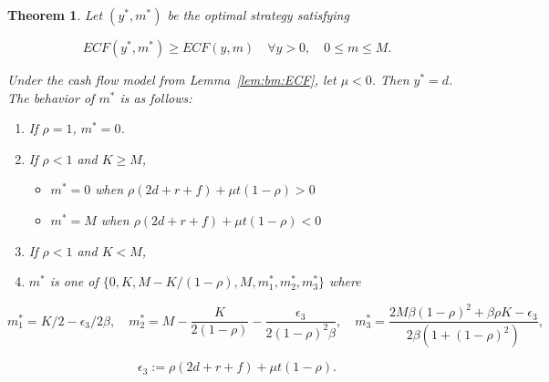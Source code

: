 \documentclass[11pt]{article}
\theoremstyle{plain}
\numberwithin{equation}{section}
\newtheorem{thm}{Theorem}[section]
\newcommand{\Red}{\color{Red}}
\begin{document}
{{\begin{thm}\label{thm:single:muNeg}
	Let $(y^*, m^*)$ be the optimal strategy satisfying

$$ECF(y^*,m^*)\geq ECF(y,m) \quad \forall y>0,\quad  0\leq m\leq M. $$

{\Red Under the cash flow model from  Lemma~\ref{lem:bm:ECF}, let $\mu<0$. Then $y^*=d$. The behavior of $m^*$ is as follows:}
\begin{enumerate}
	\item If $\rho=1$, $m^*=0$.
	\item If $\rho<1$ and $K\geq M$,
		\begin{itemize}
			\item $m^*=0$ when $\rho(2d+r+f)+\mu t(1-\rho)>0$
			\item $m^*=M$ when $\rho(2d+r+f)+\mu t(1-\rho)<0$
		\end{itemize}
	\item If $\rho<1$ and $K< M$,	
	\item[] $m^*$ is one of $\{0,K, M-K/(1-\rho), M, m^*_1, m^*_2, m^*_3\}$ where  
\end{enumerate}
%
$$ 
m^*_1=K/2-\epsilon_3/2\beta, \quad
m^*_2=M-\frac{K}{2(1-\rho)}-\frac{\epsilon_3}{2(1-\rho)^2\beta},
\quad 
m^*_3=\frac{2M\beta (1-\rho)^2 +\beta\rho K-\epsilon_3}{2\beta(1+(1-\rho)^2)},
$$ 

$$\epsilon_3:=\rho(2d+r+f)+\mu t(1-\rho).
$$




%
%


\end{thm}}}
\end{document}
